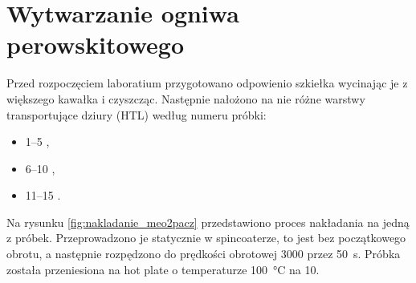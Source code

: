 \documentclass[a4, 12pt]{article}
\begin{document}
	
	
	\section{Wytwarzanie ogniwa perowskitowego}
	Przed rozpoczęciem laboratium przygotowano odpowienio szkiełka wycinając je z większego kawałka i czyszcząc. Następnie nałożono na nie różne warstwy transportujące dziury (HTL) według numeru próbki:
	\begin{itemize}
		\item \numrange{1}{5} \;\textemdash\; , 
		\item \numrange{6}{10} \;\textemdash\; , 
		\item \numrange{11}{15} \;\textemdash\; .
	\end{itemize}
	Na rysunku \ref{fig:nakladanie_meo2pacz} przedstawiono proces nakładania  na jedną z próbek. Przeprowadzono je statycznie w spincoaterze, to jest bez początkowego obrotu, a następnie rozpędzono do prędkości obrotowej \qty{3000}{\rpm} przez \qty{50}{\s}. Próbka została przeniesiona na hot plate o temperaturze \qty{100}{\degreeCelsius} na \qty{10}{\min}.
	
\end{document}
